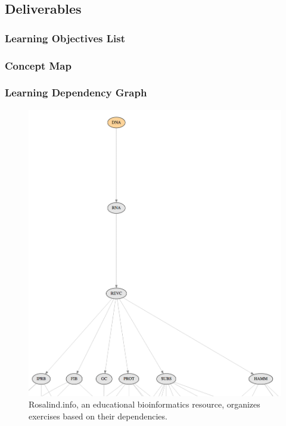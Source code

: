 \documentclass[11pt]{article}
\begin{document}
          \subsection{Deliverables}

          \subsubsection{Learning Objectives List}
          \subsubsection{Concept Map}
          \subsubsection{Learning Dependency Graph}
\begin{figure}[ht!]
        \begin{center}
                \includegraphics[height=0.5\textheight]{rosalind.png}
        \end{center}
        \caption{Rosalind.info, an educational bioinformatics resource, 
        organizes exercises based on their dependencies.}
        \label{fig:rosalind}
\end{figure}
\end{document}
